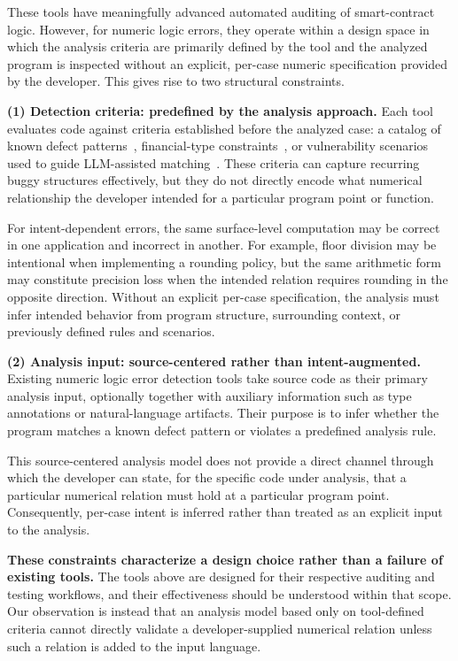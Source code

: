 \documentclass[pdflatex,sn-basic]{sn-jnl}%
\theoremstyle{thmstyleone}%
\theoremstyle{thmstyletwo}%
\theoremstyle{thmstylethree}%
\begin{document}
These tools have meaningfully advanced automated auditing of smart-contract
logic. However, for numeric logic errors, they operate within a design space in
which the analysis criteria are primarily defined by the tool and the analyzed
program is inspected without an explicit, per-case numeric specification
provided by the developer. This gives rise to two structural constraints.

\smallskip
\noindent\textbf{(1) Detection criteria: predefined by the analysis approach.}
Each tool evaluates code against criteria established before the analyzed case:
a catalog of known defect patterns~\citep{numscout}, financial-type
constraints~\citep{sctype}, or vulnerability scenarios used to guide
LLM-assisted matching~\citep{gptscan}.
These criteria can capture recurring buggy structures effectively, but they do
not directly encode what numerical relationship the developer intended for a
particular program point or function.

For intent-dependent errors, the same surface-level computation may be correct
in one application and incorrect in another.
For example, floor division may be intentional when implementing a
rounding policy, but the same arithmetic form may constitute precision loss
when the intended relation requires rounding in the opposite direction.
Without an explicit per-case specification, the analysis must infer intended
behavior from program structure, surrounding context, or previously defined
rules and scenarios.

\smallskip
\noindent\textbf{(2) Analysis input: source-centered rather than
intent-augmented.}
Existing numeric logic error detection tools take source code as their primary
analysis input, optionally together with auxiliary information such as type
annotations or natural-language artifacts.
Their purpose is to infer whether the program matches a known defect pattern or
violates a predefined analysis rule.

This source-centered analysis model does not provide a direct channel through
which the developer can state, for the specific code under analysis, that a
particular numerical relation must hold at a particular program point.
Consequently, per-case intent is inferred rather than treated as an explicit
input to the analysis.

\smallskip
\noindent\textbf{These constraints characterize a design choice rather than a
failure of existing tools.}
The tools above are designed for their respective auditing and testing
workflows, and their effectiveness should be understood within that scope.
Our observation is instead that an analysis model based only on
tool-defined criteria cannot directly validate a developer-supplied numerical
relation unless such a relation is added to the input language.
\end{document}

